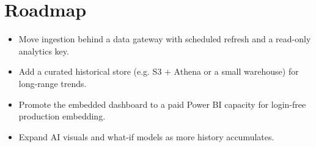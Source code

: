 \documentclass[11pt,a4paper]{article}
\begin{document}
\section{Roadmap}
\begin{itemize}[leftmargin=1.2em]
  \item Move ingestion behind a data gateway with scheduled refresh and a read-only analytics key.
  \item Add a curated historical store (e.g. S3 + Athena or a small warehouse) for long-range trends.
  \item Promote the embedded dashboard to a paid Power BI capacity for login-free production embedding.
  \item Expand AI visuals and what-if models as more history accumulates.
\end{itemize}
\end{document}
